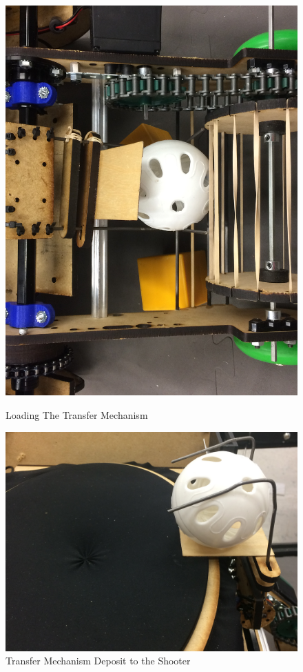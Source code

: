    \begin{figure}[ht!]
	\centering
	\begin{minipage}{.48\textwidth}
	  \centering
	  \includegraphics[width=0.8\linewidth]{Design_Overview/Phillip_1.JPG}
	  \caption{Loading The Transfer Mechanism}
	\end{minipage}%
	\begin{minipage}{.48\textwidth}
	  \centering
	  \includegraphics[width=0.8\linewidth]{Design_Overview/Phillip_2.JPG}
	  \caption{Transfer Mechanism Deposit to the Shooter}
	\end{minipage}
	\end{figure}

